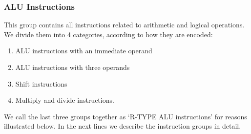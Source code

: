 \documentclass[oneside]{book}
\begin{document}
\subsubsection{ALU Instructions}

This group contains all instructions related to arithmetic
and logical operations. We divide them into 4 categories,
according to how they are encoded:

\begin{enumerate}

\item ALU instructions with an immediate operand
\item ALU instructions with three operands
\item Shift instructions
\item Multiply and divide instructions.

\end{enumerate}

We call the last three groups together as `R-TYPE ALU instructions'
for reasons illustrated below. In the next lines we describe the
instruction groups in detail.
\end{document}
